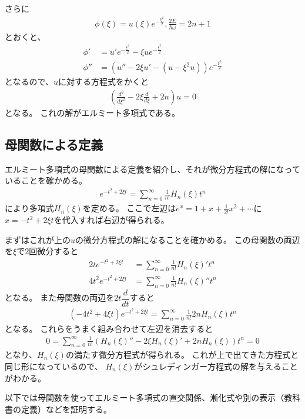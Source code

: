 \documentclass[uplatex]{jsarticle}
\begin{document}
さらに
\begin{align*}
\phi(\xi)=u(\xi)e^{-\frac{\xi^2}{2}}, \frac{2E}{\hbar\omega}=2n+1
\end{align*}
とおくと、
\begin{align*}
\phi'&=u'e^{-\frac{\xi^2}{2}}-\xi ue^{-\frac{\xi^2}{2}}\\
\phi''&=(u''-2\xi u'-(u-\xi^2u))e^{-\frac{\xi^2}{2}}
\end{align*}
となるので、$u$に対する方程式をかくと
\begin{align*}
(\frac{d^2}{d\xi^2}-2\xi\frac{d}{d\xi}+2n)u=0
\end{align*}
となる。
これの解がエルミート多項式である。

\subsection{母関数による定義}
エルミート多項式の母関数による定義を紹介し、それが微分方程式の解になっていることを確かめる。
\begin{align*}
e^{-t^2+2\xi t}=\sum_{n=0}^\infty\frac{1}{n!}H_n(\xi)t^n
\end{align*}
により多項式$H_n(\xi)$を定める。
ここで左辺は$e^x=1+x+\frac{1}{2!}x^2+\cdots$に$x=-t^2+2\xi t$を代入すれば右辺が得られる。

まずはこれが上の$u$の微分方程式の解になることを確かめる。
この母関数の両辺を$\xi$で$2$回微分すると
\begin{align*}
2te^{-t^2+2\xi t}&=\sum_{n=0}^\infty\frac{1}{n!}H_n(\xi)'t^n\\
4t^2e^{-t^2+2\xi t}&=\sum_{n=0}^\infty\frac{1}{n!}H_n(\xi)''t^n
\end{align*}
となる。
また母関数の両辺を$2t\dfrac{d}{dt}$すると
\begin{align*}
(-4t^2+4\xi t)e^{-t^2+2\xi t}=\sum_{n=0}^\infty\frac{1}{n!}2nH_n(\xi)t^n
\end{align*}
となる。
これらをうまく組み合わせて左辺を消去すると
\begin{align*}
0=\sum_{n=0}^\infty\frac{1}{n!}(H_n(\xi)''-2\xi H_n(\xi)'+2nH_n(\xi))t^n=0
\end{align*}
となり、$H_n(\xi)$の満たす微分方程式が得られる。
これが上で出てきた方程式と同じ形になっているので、
$H_n(\xi)$がシュレディンガー方程式の解を与えることがわかる。

以下では母関数を使ってエルミート多項式の直交関係、漸化式や別の表示（教科書の定義）などを証明する。
\end{document}
